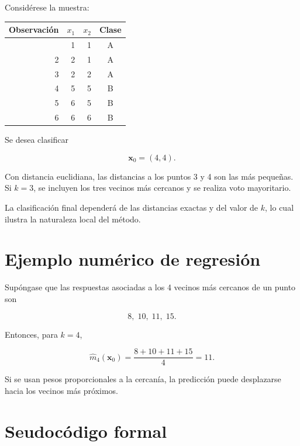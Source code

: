 \documentclass[
  spanish,
  10.5pt,
  letterpaper,
  DIV=11,
  numbers=noendperiod,
  oneside,
  open=any]{scrreprt}
\newcounter{none} %
\theoremstyle{definition}
\theoremstyle{definition}
\theoremstyle{plain}
\theoremstyle{remark}
\begin{document}

Considérese la muestra:

{\def\LTcaptype{none} %
\begin{longtable}[]{@{}rrrc@{}}
\toprule\noalign{}
Observación & \(x_1\) & \(x_2\) & Clase \\
\midrule\noalign{}
\endhead
\bottomrule\noalign{}
\endlastfoot
1 & 1 & 1 & A \\
2 & 2 & 1 & A \\
3 & 2 & 2 & A \\
4 & 5 & 5 & B \\
5 & 6 & 5 & B \\
6 & 6 & 6 & B \\
\end{longtable}
}

Se desea clasificar

\[
\mathbf{x}_0=(4,4).
\]

Con distancia euclidiana, las distancias a los puntos 3 y 4 son las más
pequeñas. Si \(k=3\), se incluyen los tres vecinos más cercanos y se
realiza voto mayoritario.

La clasificación final dependerá de las distancias exactas y del valor
de \(k\), lo cual ilustra la naturaleza local del método.

\section*{Ejemplo numérico de
regresión}\label{ejemplo-numuxe9rico-de-regresiuxf3n}


Supóngase que las respuestas asociadas a los 4 vecinos más cercanos de
un punto son

\[
8,\;10,\;11,\;15.
\]

Entonces, para \(k=4\),

\[
\widehat{m}_4(\mathbf{x}_0)
=
\frac{8+10+11+15}{4}=11.
\]

Si se usan pesos proporcionales a la cercanía, la predicción puede
desplazarse hacia los vecinos más próximos.

\section*{Seudocódigo formal}\label{seudocuxf3digo-formal-3}
\end{document}
